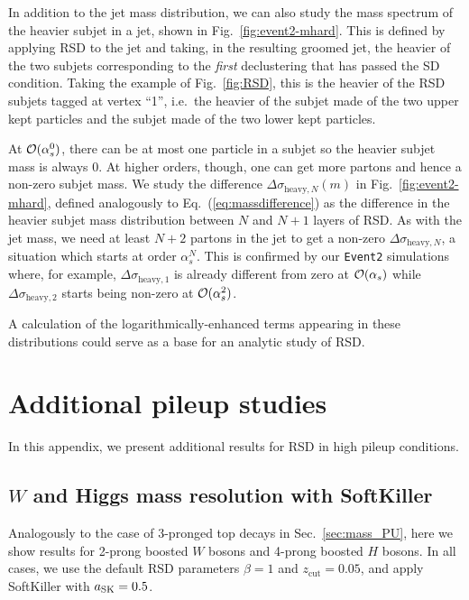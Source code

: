 \documentclass[11pt,a4paper]{article}
\newcommand{\zcut}{z_\text{cut}}
\DeclareRobustCommand{\Sec}[1]{Sec.~\ref{#1}}
\DeclareRobustCommand{\Fig}[1]{Fig.~\ref{#1}}
\DeclareRobustCommand{\Eq}[1]{Eq.~(\ref{#1})}
\begin{document}
In addition to the jet mass distribution, we can also study the mass
spectrum of the heavier subjet in a jet, shown in \Fig{fig:event2-mhard}.
%
This is defined by applying RSD to the jet and taking, in the resulting groomed jet, the heavier of the
two subjets corresponding to the \emph{first} declustering that has passed
the SD condition.
%
Taking the example of
  \Fig{fig:RSD}, this is the heavier of the RSD
  subjets tagged at vertex ``1'', i.e.\ the heavier of the subjet made
  of the two upper kept particles and the subjet made of the two lower
  kept particles.

At ${\cal O}(\alpha_s^0)$, there can be at most one particle in a
subjet so the heavier subjet mass is always 0.
%
At higher orders, though, one can get more
partons and hence a non-zero subjet mass.
%
We study the difference $\Delta \sigma_{\text{heavy},N}(m)$  in \Fig{fig:event2-mhard},
defined analogously to \Eq{eq:massdifference} as the difference in the heavier subjet mass distribution
between $N$ and $N+1$ layers of RSD.
%
As with the jet mass, we need at least $N+2$ partons in the
jet  to get a non-zero $\Delta\sigma_{\text{heavy},N}$, a situation which starts at order $\alpha_s^N$.
%
This is confirmed by our \texttt{Event2} simulations where, for
example, $\Delta\sigma_{\text{heavy},1}$ is already different from zero
at ${\cal O}(\alpha_s)$ while $\Delta\sigma_{\text{heavy},2}$ starts
being non-zero at ${\cal O}(\alpha_s^2)$.

A calculation of the logarithmically-enhanced terms appearing in these
distributions could serve as a base for an analytic study of RSD.

\section{Additional pileup studies}
\label{app:additionalpileup}

In this appendix, we present additional results for RSD in high pileup conditions.

\subsection{$W$ and Higgs mass resolution with SoftKiller}
\label{sec:WH-pileup}


Analogously to the case of 3-pronged top decays in \Sec{sec:mass_PU}, here we show results for 2-prong boosted
$W$ bosons and 4-prong boosted $H$ bosons.
%
In all cases, we use the default RSD parameters $\beta = 1$ and $\zcut =0.05$, and apply SoftKiller with $a_{\rm SK} = 0.5$.
\end{document}
